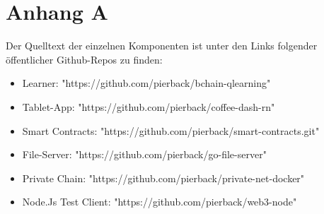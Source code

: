 \chapter{Anhang A}
\label{kap:AppendixA}
Der Quelltext der einzelnen Komponenten ist unter den Links folgender öffentlicher Github-Repos zu finden: 
\begin{itemize}
    \item Learner: "https://github.com/pierback/bchain-qlearning"
    \item Tablet-App: "https://github.com/pierback/coffee-dash-rn"
    \item Smart Contracts: "https://github.com/pierback/smart-contracts.git"
    \item File-Server: "https://github.com/pierback/go-file-server"
    \item Private Chain: "https://github.com/pierback/private-net-docker"
    \item Node.Js Test Client: "https://github.com/pierback/web3-node"
\end{itemize}